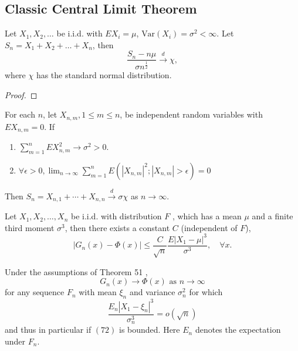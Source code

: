 \subsection{Classic Central Limit Theorem}

\begin{theorem}
    Let $X_1,X_2,\ldots$ be i.i.d. with $EX_i=\mu$, $\text{Var}(X_i)=\sigma^2<\infty$. Let $S_n=X_1+X_2+\ldots+X_n$, then
    \begin{equation}
        \frac{S_n-n\mu}{\sigma n^{\frac{1}{2}}} \stackrel{d}{\rightarrow} \chi,
    \end{equation}
    where $\chi$ has the standard normal distribution.
\end{theorem}

\begin{proof}

\end{proof}

\begin{theorem}
    For each $n$, let $X_{n,m},1\leq m\leq n$, be independent random variables with $EX_{n,m}=0$. If
    \begin{enumerate}
        \item $\sum_{m=1}^{n}EX_{n,m}^{2} \rightarrow \sigma^{2}>0$.
        \item $\forall\epsilon>0,\lim_{n\rightarrow\infty}\sum_{m=1}^{n}E\left(\left|X_{n,m}\right|^{2};\left|X_{n,m}\right|>\epsilon\right)=0$
    \end{enumerate}
    Then $S_{n}=X_{n,1}+\cdots+X_{n,n}\stackrel{d}{\rightarrow}\sigma\chi$ as $n\rightarrow\infty$.
\end{theorem}

\begin{theorem}
    Let $X_{1},X_{2},\ldots,X_{n}$ be i.i.d. with distribution $F$ , which has a mean $\mu$ and a finite third moment $\sigma^{3}$, then there exists a constant $C$ (independent of $F$),
    \begin{equation}
        \left|G_{n}(x)-\Phi(x)\right|\leq\frac{C}{\sqrt{n}}\frac{E\left|X_{1}-\mu\right|^{3}}{\sigma^{3}},\quad\forall x.
    \end{equation}
\end{theorem}

\begin{corollary}
    Under the assumptions of Theorem 51 ,
    $$
        G_{n}(x) \rightarrow \Phi(x) \text { as } n \rightarrow \infty
    $$
    for any sequence $F_{n}$ with mean $\xi_{n}$ and variance $\sigma_{n}^{2}$ for which
    $$
        \frac{E_{n}\left|X_{1}-\xi_{n}\right|^{3}}{\sigma_{n}^{3}}=o(\sqrt{n})
    $$
    and thus in particular if $(72)$ is bounded. Here $E_{n}$ denotes the expectation under $F_{n}$.
\end{corollary}

